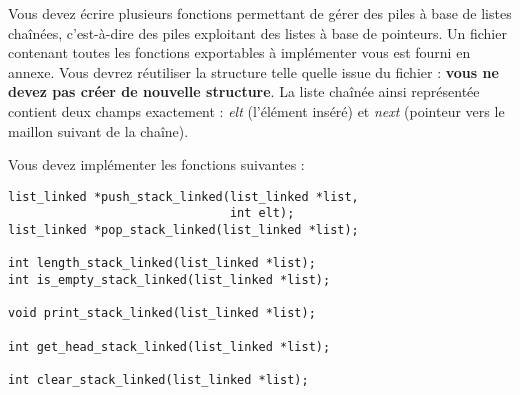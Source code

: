 

\vspace*{0.7cm}

\noindent {}

\bigskip

%

\noindent Vous devez écrire plusieurs fonctions permettant de gérer des piles à base de listes chaînées, c'est-à-dire des piles exploitant des listes à base de pointeurs.
Un fichier  contenant toutes les fonctions exportables à implémenter vous est fourni en annexe.
Vous devrez réutiliser la structure  telle quelle issue du fichier  : \textbf{vous ne devez pas créer de nouvelle structure}.
La liste chaînée ainsi représentée contient deux champs exactement : \textit{elt} (l'élément inséré) et \textit{next} (pointeur vers le maillon suivant de la chaîne).

\smallskip




\bigskip

\noindent Vous devez implémenter les fonctions suivantes :

\bigskip

\lstset{language=C}
\begin{lstlisting}[frame=single]
list_linked *push_stack_linked(list_linked *list,
                               int elt);
list_linked *pop_stack_linked(list_linked *list);

int length_stack_linked(list_linked *list);
int is_empty_stack_linked(list_linked *list);

void print_stack_linked(list_linked *list);

int get_head_stack_linked(list_linked *list);

int clear_stack_linked(list_linked *list);
\end{lstlisting}


